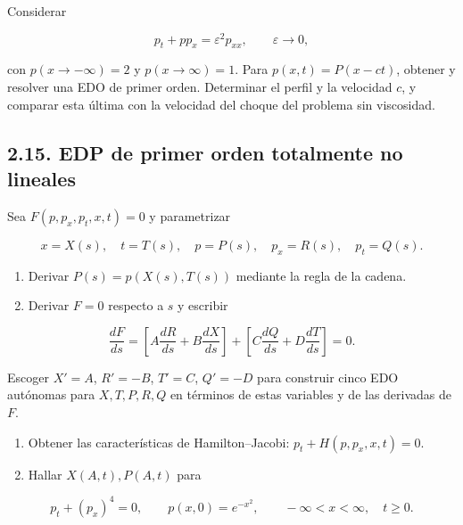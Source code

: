 \documentclass[11pt,a4paper]{article}
\begin{document}
Considerar

\[p_t+pp_x=\varepsilon^2p_{xx},\qquad\varepsilon\to0,\]

con \(p(x\to-\infty)=2\) y \(p(x\to\infty)=1\). Para \(p(x,t)=P(x-ct)\),
obtener y resolver una EDO de primer orden. Determinar el perfil y la
velocidad \(c\), y comparar esta última con la velocidad del choque del
problema sin viscosidad.

\hypertarget{edp-de-primer-orden-totalmente-no-lineales}{%
\subsection{2.15. EDP de primer orden totalmente no
lineales}\label{edp-de-primer-orden-totalmente-no-lineales}}

Sea \(F(p,p_x,p_t,x,t)=0\) y parametrizar

\[x=X(s),\quad t=T(s),\quad p=P(s),\quad p_x=R(s),\quad p_t=Q(s).\]

\begin{enumerate}
\def\labelenumi{(\alph{enumi})}
\item
  Derivar \(P(s)=p(X(s),T(s))\) mediante la regla de la cadena.
\item
  Derivar \(F=0\) respecto a \(s\) y escribir
\end{enumerate}

\[\frac{dF}{ds}=\left[A\frac{dR}{ds}+B\frac{dX}{ds}\right]+\left[C\frac{dQ}{ds}+D\frac{dT}{ds}\right]=0.\]

Escoger \(X'=A\), \(R'=-B\), \(T'=C\), \(Q'=-D\) para construir cinco
EDO autónomas para \(X,T,P,R,Q\) en términos de estas variables y de las
derivadas de \(F\).

\begin{enumerate}
\def\labelenumi{(\alph{enumi})}
\setcounter{enumi}{2}
\item
  Obtener las características de Hamilton--Jacobi:
  \(p_t+H(p,p_x,x,t)=0\).
\item
  Hallar \(X(A,t),P(A,t)\) para
\end{enumerate}

\[p_t+(p_x)^4=0,\qquad p(x,0)=e^{-x^2},\qquad -\infty<x<\infty,\quad t\ge0.\]
\end{document}
